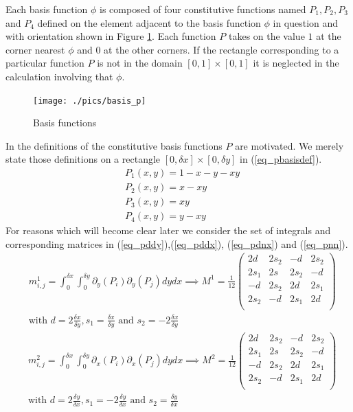 \documentclass[11pt,fleqn]{article}
\theoremstyle{defstyle}
\begin{document}
Each basis function $\phi$ is composed of four constitutive functions named $P_1, P_2, P_3$ and $P_4$ defined on the element adjacent to the basis function $\phi$ in question and with orientation shown in Figure \ref{fig_pbasis}. Each function $P$ takes on the value $1$ at the corner nearest $\phi$ and $0$ at the other corners. If the rectangle corresponding to a particular function $P$ is not in the domain $[0,1]\times[0,1]$ it is neglected in the calculation involving that $\phi$. 
\begin{figure}[H] 
\centering
\texttt{[image: ./pics/basis\_p]}
\caption{Basis functions} 
\label{fig_pbasis}
\end{figure}
In \cite{vrb} the definitions of the constitutive basis functions $P$ are motivated. We merely state those definitions on a rectangle $[0,\delta x] \times [0, \delta y]$ in (\ref{eq_pbasisdef}). 
\begin{equation}
\begin{aligned}
&P_1(x,y) = 1 -x-y-xy \\
&P_2(x,y) = x-xy \\
&P_3(x,y) = xy \\
&P_4(x,y) = y-xy 
\label{eq_pbasisdef}
\end{aligned}
\end{equation}  
For reasons which will become clear later we consider the set of integrals and corresponding matrices in (\ref{eq_pddy}),(\ref{eq_pddx}),  (\ref{eq_pdnx}) and (\ref{eq_pnn}).
\begin{equation}
\begin{aligned}
&m^1_{i,j} = \int_0^{\delta x} \int_0^{\delta y} \partial_y(P_i) \partial_y(P_j) dydx \implies
M^1 = \frac{1}{12}\begin{pmatrix}
2d & 2s_2 & -d & 2s_2 \\
2s_1 & 2s & 2s_2 & -d \\
-d & 2s_2 & 2d & 2s_1 \\
2s_2 & -d & 2s_1 & 2d \\
\end{pmatrix} \\
&\text{with } d = 2\frac{\delta x}{\delta y}, s_1 = \frac{\delta x}{\delta y} \text{ and } s_2 = -2\frac{\delta x}{\delta y}
\end{aligned}
\label{eq_pddy}
\end{equation}
\begin{equation}
\begin{aligned}
&m^2_{i,j} = \int_0^{\delta x} \int_0^{\delta y} \partial_x(P_i) \partial_x(P_j) dydx \implies
M^2 = \frac{1}{12}\begin{pmatrix}
2d & 2s_2 & -d & 2s_2 \\
2s_1 & 2s & 2s_2 & -d \\
-d & 2s_2 & 2d & 2s_1 \\
2s_2 & -d & 2s_1 & 2d \\
\end{pmatrix} \\
&\text{with } d = 2\frac{\delta y}{\delta x}, s_1 = -2\frac{\delta y}{\delta x} \text{ and } s_2 = \frac{\delta y}{\delta x}
\end{aligned}
\label{eq_pddx}
\end{equation}
\end{document}

